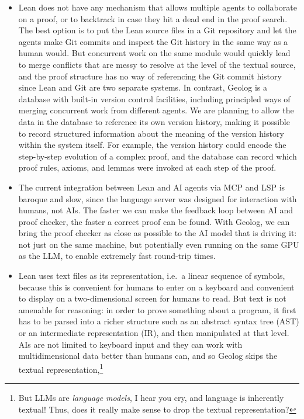 \documentclass{article}
\begin{document}
\begin{itemize}
    \item Lean does not have any mechanism that allows multiple agents to collaborate on a proof, or to backtrack in case they hit a dead end in the proof search.
        The best option is to put the Lean source files in a Git repository and let the agents make Git commits and inspect the Git history in the same way as a human would.
        But concurrent work on the same module would quickly lead to merge conflicts that are messy to resolve at the level of the textual source, and the proof structure has no way of referencing the Git commit history since Lean and Git are two separate systems.
        In contrast, Geolog is a database with built-in version control facilities, including principled ways of merging concurrent work from different agents.
        We are planning to allow the data in the database to reference its own version history, making it possible to record structured information about the meaning of the version history within the system itself.
        For example, the version history could encode the step-by-step evolution of a complex proof, and the database can record which proof rules, axioms, and lemmas were invoked at each step of the proof.

    \item The current integration between Lean and AI agents via MCP and LSP is baroque and slow, since the language server was designed for interaction with humans, not AIs.
        The faster we can make the feedback loop between AI and proof checker, the faster a correct proof can be found.
        With Geolog, we can bring the proof checker as close as possible to the AI model that is driving it: not just on the same machine, but potentially even running on the same GPU as the LLM, to enable extremely fast round-trip times.

    \item Lean uses text files as its representation, i.e.\ a linear sequence of symbols, because this is convenient for humans to enter on a keyboard and convenient to display on a two-dimensional screen for humans to read.
        But text is not amenable for reasoning: in order to prove something about a program, it first has to be parsed into a richer structure such as an abstract syntax tree (AST) or an intermediate representation (IR), and then manipulated at that level.
        AIs are not limited to keyboard input and they can work with multidimensional data better than humans can, and so Geolog skips the textual representation,\footnote{But LLMs are \emph{language models}, I hear you cry, and language is inherently textual!
        Thus, does it really make sense to drop the textual representation?

}
\end{itemize}
\end{document}
